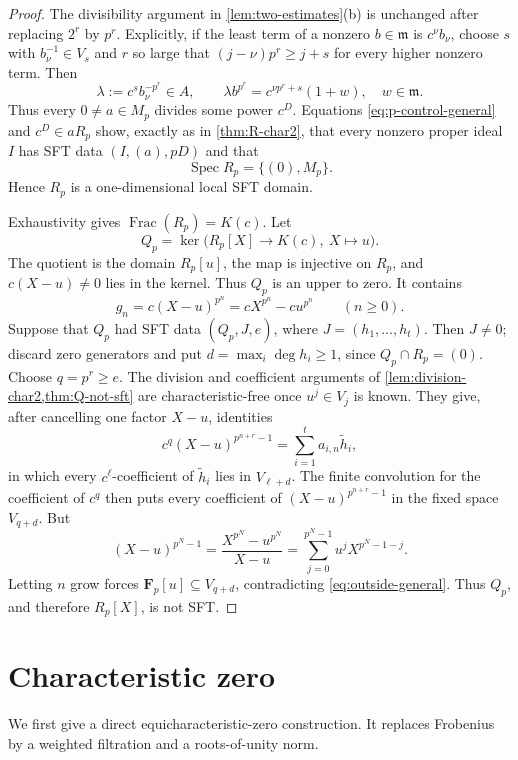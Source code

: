 \documentclass[11pt,reqno]{amsart}
\numberwithin{equation}{section}
\theoremstyle{plain}
\theoremstyle{definition}
\theoremstyle{remark}
\newcommand{\F}{\mathbf F}
\newcommand{\Spec}{\operatorname{Spec}}
\newcommand{\Frac}{\operatorname{Frac}}
\newcommand{\fm}{\mathfrak m}
\begin{document}
\begin{proof}
The divisibility argument in \cref{lem:two-estimates}(b) is unchanged after
replacing $2^r$ by $p^r$.  Explicitly, if the least term of a nonzero
$b\in\fm$ is $c^\nu b_\nu$, choose $s$ with $b_\nu^{-1}\in V_s$ and $r$
so large that $(j-\nu)p^r\geq j+s$ for every higher nonzero term.  Then
\[
 \lambda:=c^sb_\nu^{-p^r}\in A,
 \qquad
 \lambda b^{p^r}=c^{\nu p^r+s}(1+w),\quad w\in\fm.
\]
Thus every $0\neq a\in M_p$ divides some power $c^D$.  Equations
\eqref{eq:p-control-general} and $c^D\in aR_p$ show, exactly as in
\cref{thm:R-char2}, that every nonzero proper ideal $I$ has SFT data
$(I,(a),pD)$ and that
\[
  \Spec R_p=\{(0),M_p\}.
\]
Hence $R_p$ is a one-dimensional local SFT domain.

Exhaustivity gives $\Frac(R_p)=K(c)$.  Let
\[
Q_p=\ker\bigl(R_p[X]\longrightarrow K(c),\ X\longmapsto u\bigr).
\]
The quotient is the domain $R_p[u]$, the map is injective on $R_p$, and
$c(X-u)\neq0$ lies in the kernel.  Thus $Q_p$ is an upper to zero.  It
contains
\begin{equation}\label{eq:gn-general}
  g_n=c(X-u)^{p^n}=cX^{p^n}-cu^{p^n}\qquad(n\geq0).
\end{equation}
Suppose that $Q_p$ had SFT data $(Q_p,J,e)$, where
$J=(h_1,\ldots,h_t)$.  Then $J\neq0$; discard zero generators and put
$d=\max_i\deg h_i\geq1$, since $Q_p\cap R_p=(0)$.  Choose $q=p^r\geq e$.
The division and coefficient arguments of
\cref{lem:division-char2,thm:Q-not-sft} are characteristic-free once
$u^j\in V_j$ is known.  They
give, after cancelling one factor $X-u$, identities
\[
  c^q(X-u)^{p^{n+r}-1}
    =\sum_{i=1}^t a_{i,n}\widetilde h_i,
\]
in which every $c^\ell$-coefficient of $\widetilde h_i$ lies in
$V_{\ell+d}$.  The finite convolution for the coefficient of $c^q$ then
puts every coefficient of $(X-u)^{p^{n+r}-1}$ in the fixed space $V_{q+d}$.
But
\[
  (X-u)^{p^N-1}
   =\frac{X^{p^N}-u^{p^N}}{X-u}
   =\sum_{j=0}^{p^N-1}u^jX^{p^N-1-j}.
\]
Letting $n$ grow forces $\F_p[u]\subseteq V_{q+d}$, contradicting
\eqref{eq:outside-general}.  Thus $Q_p$, and therefore $R_p[X]$, is not
SFT.
\end{proof}

\section{Characteristic zero}
\label{sec:characteristic-zero}

We first give a direct equicharacteristic-zero construction.  It replaces
Frobenius by a weighted filtration and a roots-of-unity norm.
\end{document}
